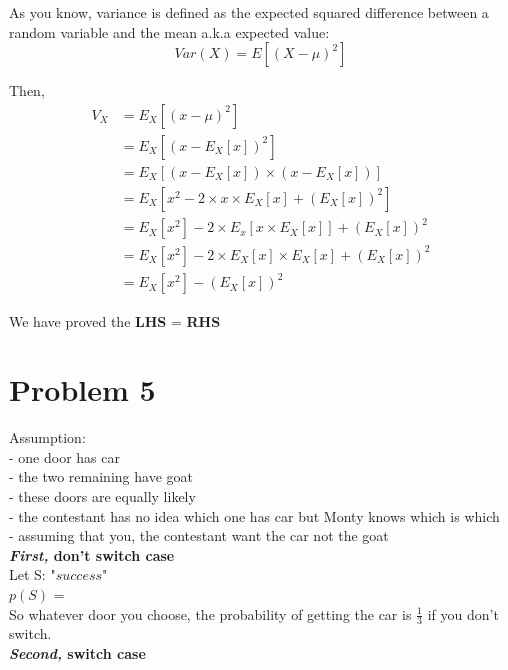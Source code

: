 \documentclass{article}
\begin{document}
As you know, variance is defined as the expected squared difference between a random variable and the mean a.k.a expected value: \\
$$
Var(X) = E[(X- \mu)^2]
$$

Then,
\begin{equation}
    \begin{split}
    V_X & = E_X[(x-\mu)^2] \\
        & = E_X[(x - E_X[x])^2] \\
        & = E_X[(x - E_X[x])\times(x - E_X[x])] \\
        & = E_X[ x^2 - 2\times x\times E_X[x] + (E_X[x])^2 ] \\
        & = E_X[x^2] - 2\times E_x[x\times E_X[x]] + (E_X[x])^2  \\
        & = E_X[x^2] - 2\times E_X[x]\times E_X[x] + (E_X[x])^2 \\
        & = E_X[x^2] - (E_X[x])^2 
    \end{split}
\end{equation}

We have proved the \textbf{LHS} = \textbf{RHS}


\section*{Problem 5}

Assumption: \\
- one door has car\\
- the two remaining have goat \\
- these doors are equally likely \\
- the contestant has no idea which one has car but Monty knows which is which \\
- assuming that you, the contestant want the car not the goat \\

\textbf {\textit{First,} don't switch case}  \\

Let S: "$success$" \\ 
\implies $p(S)$ =  \\

So whatever door you choose, the probability of getting the car is $\frac{1}{3}$ if you don't switch. \\

\textbf {\textit{Second,} switch case}\\
\end{document}
